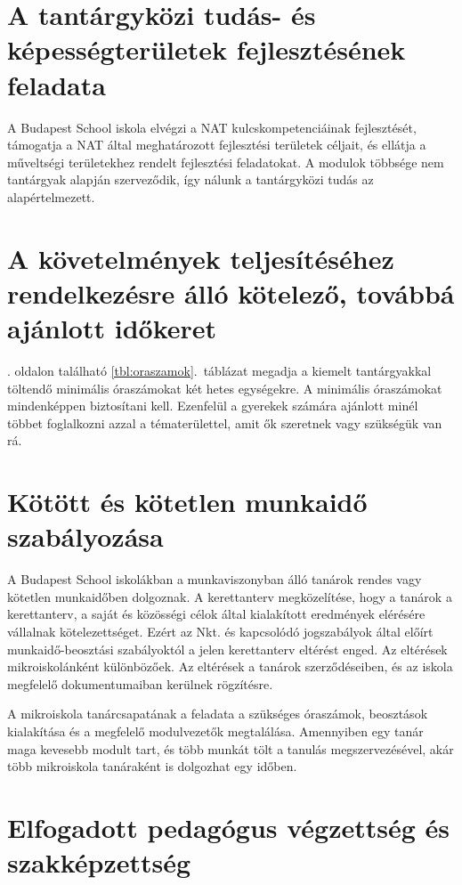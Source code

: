 \section{A tantárgyközi tudás- és képességterületek fejlesztésének feladata}

A Budapest School iskola elvégzi a NAT kulcskompetenciáinak fejlesztését, támogatja a NAT által meghatározott fejlesztési területek céljait, és ellátja a műveltségi területekhez rendelt fejlesztési feladatokat. A modulok többsége nem tantárgyak alapján szerveződik, így nálunk a tantárgyközi tudás az alapértelmezett.

\section{A követelmények teljesítéséhez rendelkezésre álló kötelező, továbbá ajánlott időkeret}

. oldalon található \ref{tbl:oraszamok}.~táblázat
megadja a kiemelt tantárgyakkal töltendő minimális óraszámokat két hetes egységekre. A minimális óraszámokat mindenképpen biztosítani kell. 
Ezenfelül a gyerekek számára ajánlott minél többet foglalkozni azzal a tématerülettel, amit ők szeretnek vagy szükségük van rá.

\section{Kötött és kötetlen munkaidő szabályozása}

A Budapest School iskolákban a munkaviszonyban álló tanárok rendes vagy kötetlen munkaidőben dolgoznak.
A kerettanterv megközelítése, hogy a tanárok a kerettanterv, a saját és közösségi célok által kialakított eredmények elérésére vállalnak kötelezettséget. Ezért az Nkt. és kapcsolódó jogszabályok által előírt munkaidő-beosztási szabályoktól a jelen kerettanterv eltérést enged. Az eltérések mikroiskolánként különbözőek. Az eltérések a tanárok szerződéseiben, és az iskola megfelelő dokumentumaiban kerülnek rögzítésre.

A mikroiskola tanárcsapatának a feladata a szükséges óraszámok, beosztások kialakítása és a megfelelő modulvezetők megtalálása. Amennyiben egy tanár maga kevesebb modult tart, és több munkát tölt a tanulás megszervezésével, akár több mikroiskola tanáraként is dolgozhat egy időben.

\section{Elfogadott pedagógus végzettség és szakképzettség}

